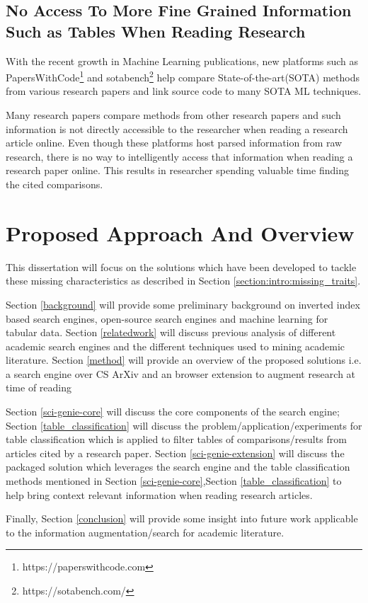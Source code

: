 \subsection{No Access To More Fine Grained Information Such as Tables When Reading Research}
With the recent growth in Machine Learning publications, new platforms such as PapersWithCode\footnote{https://paperswithcode.com} and 
sotabench\footnote{https://sotabench.com/} help compare State-of-the-art(SOTA) methods from various research papers and link source code 
to many SOTA ML techniques. 

Many research papers compare methods from other research papers and such information is not directly accessible to the
researcher when reading a research article online. Even though these platforms 
host parsed information from raw research, there is no way to intelligently access that information when reading a research paper online. 
This results in researcher spending valuable time finding the cited comparisons.

\section{Proposed Approach And Overview}
This dissertation will focus on the solutions which have been developed to tackle these missing characteristics as described in Section \ref{section:intro:missing_traits}. 

Section \ref{background} will provide some preliminary background on inverted index based search engines, open-source search engines and machine learning for tabular data.  
Section \ref{relatedwork} will discuss previous analysis of different academic search engines and the different techniques
used to mining academic literature. Section \ref{method} will provide an overview of the proposed solutions i.e. a search engine over
CS ArXiv and an browser extension to augment research at time of reading 

Section \ref{sci-genie-core} will discuss the core components of the search engine; Section \ref{table_classification} will
discuss the problem/application/experiments for table classification which is applied to filter tables of comparisons/results from articles cited by a research paper. 
Section \ref{sci-genie-extension} will discuss the packaged solution which leverages the search engine and the table classification methods mentioned in  
Section \ref{sci-genie-core},Section \ref{table_classification} to help bring context relevant information when reading research articles. 

Finally, Section \ref{conclusion} will provide some insight into future work applicable to the information augmentation/search for academic literature. 